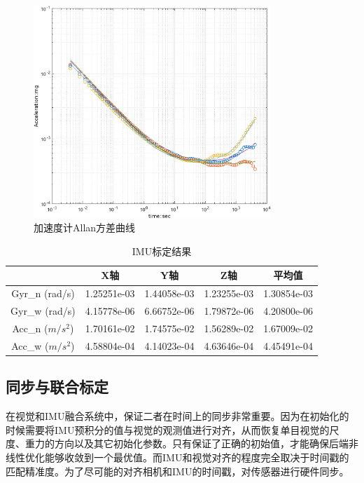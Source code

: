 \begin{figure}[!h]\setlength{\belowcaptionskip}{-12pt}
	\centering
	\includegraphics[width=0.8\textwidth]{figures/chapter2/fig2_14}
	\caption{加速度计Allan方差曲线}\label{fig2_14}
\end{figure}
\begin{table}[h]\setlength{\abovecaptionskip}{6pt}
	\centering
	\caption{IMU标定结果} \label{tab2.5}
	\begin{tabular*}{0.9\textwidth}{@{\extracolsep{\fill}}ccccc}
		\toprule
					&X轴		&Y轴	  &Z轴	&平均值 \\
		\midrule
		Gyr\_n (rad/s)	&1.25251e-03	&1.44058e-03	&1.23255e-03	&1.30854e-03\\
		Gyr\_w (rad/s)	&4.15778e-06	&6.66752e-06	&1.79872e-06	&4.20800e-06\\
		Acc\_n ($m/s^2$)	&1.70161e-02	&1.74575e-02	&1.56289e-02	&1.67009e-02\\
		Acc\_w ($m/s^2$)	&4.58804e-04	&4.14023e-04	&4.63646e-04	&4.45491e-04\\		
		\bottomrule
	\end{tabular*}
\end{table}
\subsection{同步与联合标定}
在视觉和IMU融合系统中，保证二者在时间上的同步非常重要。因为在初始化的时候需要将IMU预积分的值与视觉的观测值进行对齐，从而恢复单目视觉的尺度、重力的方向以及其它初始化参数。只有保证了正确的初始值，才能确保后端非线性优化能够收敛到一个最优值。而IMU和视觉对齐的程度完全取决于时间戳的匹配精准度。为了尽可能的对齐相机和IMU的时间戳，对传感器进行硬件同步。

